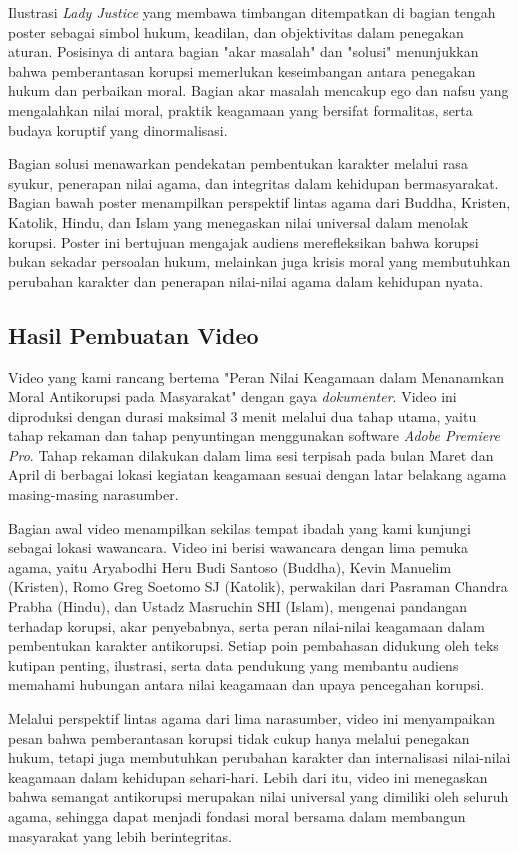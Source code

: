Ilustrasi \textit{Lady Justice} yang membawa timbangan ditempatkan di bagian tengah poster sebagai simbol hukum, keadilan, dan objektivitas dalam penegakan aturan. Posisinya di antara bagian "akar masalah" dan "solusi" menunjukkan bahwa pemberantasan korupsi memerlukan keseimbangan antara penegakan hukum dan perbaikan moral. Bagian akar masalah mencakup ego dan nafsu yang mengalahkan nilai moral, praktik keagamaan yang bersifat formalitas, serta budaya koruptif yang dinormalisasi.

Bagian solusi menawarkan pendekatan pembentukan karakter melalui rasa syukur, penerapan nilai agama, dan integritas dalam kehidupan bermasyarakat. Bagian bawah poster menampilkan perspektif lintas agama dari Buddha, Kristen, Katolik, Hindu, dan Islam yang menegaskan nilai universal dalam menolak korupsi. Poster ini bertujuan mengajak audiens merefleksikan bahwa korupsi bukan sekadar persoalan hukum, melainkan juga krisis moral yang membutuhkan perubahan karakter dan penerapan nilai-nilai agama dalam kehidupan nyata.

\subsection{Hasil Pembuatan Video}

Video yang kami rancang bertema "Peran Nilai Keagamaan dalam Menanamkan Moral Antikorupsi pada Masyarakat" dengan gaya \textit{dokumenter}. Video ini diproduksi dengan durasi maksimal 3 menit melalui dua tahap utama, yaitu tahap rekaman dan tahap penyuntingan menggunakan software \textit{Adobe Premiere Pro}. Tahap rekaman dilakukan dalam lima sesi terpisah pada bulan Maret dan April di berbagai lokasi kegiatan keagamaan sesuai dengan latar belakang agama masing-masing narasumber.

Bagian awal video menampilkan sekilas tempat ibadah yang kami kunjungi sebagai lokasi wawancara. Video ini berisi wawancara dengan lima pemuka agama, yaitu Aryabodhi Heru Budi Santoso (Buddha), Kevin Manuelim (Kristen), Romo Greg Soetomo SJ (Katolik), perwakilan dari Pasraman Chandra Prabha (Hindu), dan Ustadz Masruchin SHI (Islam), mengenai pandangan terhadap korupsi, akar penyebabnya, serta peran nilai-nilai keagamaan dalam pembentukan karakter antikorupsi. Setiap poin pembahasan didukung oleh teks kutipan penting, ilustrasi, serta data pendukung yang membantu audiens memahami hubungan antara nilai keagamaan dan upaya pencegahan korupsi.

Melalui perspektif lintas agama dari lima narasumber, video ini menyampaikan pesan bahwa pemberantasan korupsi tidak cukup hanya melalui penegakan hukum, tetapi juga membutuhkan perubahan karakter dan internalisasi nilai-nilai keagamaan dalam kehidupan sehari-hari. Lebih dari itu, video ini menegaskan bahwa semangat antikorupsi merupakan nilai universal yang dimiliki oleh seluruh agama, sehingga dapat menjadi fondasi moral bersama dalam membangun masyarakat yang lebih berintegritas.


